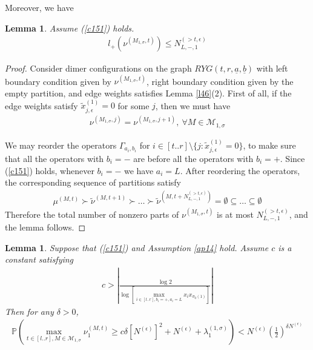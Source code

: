 \documentclass[11pt]{amsart}
\theoremstyle{plain}
\newtheorem{lemma}[theorem]{Lemma}
\theoremstyle{definition}
\theoremstyle{remark}
\newcommand\si{\sigma}
\numberwithin{equation}{section}
\numberwithin{theorem}{section}
\numberwithin{figure}{section}
\begin{document}
Moreover, we have
\begin{lemma}Assume (\ref{c151}) holds.
\begin{align*}
l_{+}(\nu^{(M_{1,\si},t)})\leq N_{L,-,1}^{(>t,\epsilon)}
\end{align*}
\end{lemma}

\begin{proof}Consider dimer configurations on the graph $RYG(t,r,\underline{a},\underline{b})$ with left boundary condition given by $\nu^{(M_{1,\si},t)}$, right boundary condition given by the empty partition, and edge weights satisfies Lemma \ref{l46}(2). First of all, if the edge weights satisfy $\tilde{x}_{j,\epsilon}^{(1)}=0$ for some $j$, then we must have
\begin{align*}
\nu^{(M_{1,\si},j)}=\nu^{(M_{1,\si},j+1)},\ \forall M\in \mathcal{M}_{1,\si}
\end{align*}

We may reorder the operators $\Gamma_{a_i,b_i}$ for $i\in [t..r]\setminus \{j:\tilde{x}_{j,\epsilon}^{(1)}=0\}$, to make sure that all the operators with $b_i=-$ are before all the operators with $b_i=+$. Since (\ref{c151}) holds, whenever $b_i=-$ we have $a_i=L$. After reordering the operators, the corresponding sequence of partitions satisfy
\begin{align*}
\mu^{(M,t)}\succ \tilde{\nu}^{(M,t+1)}\succ\ldots\succ \tilde{\nu}^{(M,t+N_{L,-,1}^{(>t,\epsilon)})}=\emptyset \subseteq \ldots\subseteq \emptyset
\end{align*}
Therefore the total number of nonzero parts of $\nu^{(M_{1,\si},t)}$ is at most $N_{L,-,1}^{(>t,\epsilon)}$, and the lemma follows.
\end{proof}




\begin{lemma}\label{l412}Suppose that (\ref{c151}) and Assumption \ref{ap14} hold. Assume $c$ is a constant satisfying
\begin{align}
c>\left|\frac{\log 2}{\log [\max_{i\in[l..r],b_i=+,a_i=L} x_{i}x_{\si_0(1)}]}\right|\label{clb}
\end{align}
Then for any $\delta>0$,
\begin{align}
\mathbb{P}\left(\max_{t\in[l..r],M\in \mathcal{M}_{1,\si}}\nu_1^{(M,t)}\geq c\delta [N^{(\epsilon)}]^2+N^{(\epsilon)}+\lambda_1^{(1,\si)}\right)<N^{(\epsilon)}\left(\frac{1}{2}\right)^{\delta N^{(\epsilon)}}\label{cn411}
\end{align}
\end{lemma}
\end{document}
